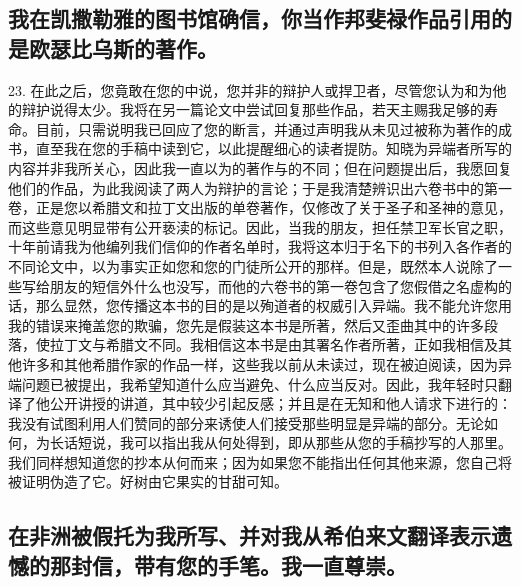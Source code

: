 
\subsection{我在凯撒勒雅的图书馆确信，你当作邦斐禄作品引用的是欧瑟比乌斯的著作。}

23. 在此之后，您竟敢在您的中说，您并非的辩护人或捍卫者，尽管您认为和为他的辩护说得太少。我将在另一篇论文中尝试回复那些作品，若天主赐我足够的寿命。目前，只需说明我已回应了您的断言，并通过声明我从未见过被称为著作的成书，直至我在您的手稿中读到它，以此提醒细心的读者提防。知晓为异端者所写的内容并非我所关心，因此我一直以为的著作与的不同；但在问题提出后，我愿回复他们的作品，为此我阅读了两人为辩护的言论；于是我清楚辨识出六卷书中的第一卷，正是您以希腊文和拉丁文出版的单卷著作，仅修改了关于圣子和圣神的意见，而这些意见明显带有公开亵渎的标记。因此，当我的朋友，担任禁卫军长官之职，十年前请我为他编列我们信仰的作者名单时，我将这本归于名下的书列入各作者的不同论文中，以为事实正如您和您的门徒所公开的那样。但是，既然本人说除了一些写给朋友的短信外什么也没写，而他的六卷书的第一卷包含了您假借之名虚构的话，那么显然，您传播这本书的目的是以殉道者的权威引入异端。我不能允许您用我的错误来掩盖您的欺骗，您先是假装这本书是所著，然后又歪曲其中的许多段落，使拉丁文与希腊文不同。我相信这本书是由其署名作者所著，正如我相信及其他许多和其他希腊作家的作品一样，这些我以前从未读过，现在被迫阅读，因为异端问题已被提出，我希望知道什么应当避免、什么应当反对。因此，我年轻时只翻译了他公开讲授的讲道，其中较少引起反感；并且是在无知和他人请求下进行的：我没有试图利用人们赞同的部分来诱使人们接受那些明显是异端的部分。无论如何，为长话短说，我可以指出我从何处得到，即从那些从您的手稿抄写的人那里。我们同样想知道您的抄本从何而来；因为如果您不能指出任何其他来源，您自己将被证明伪造了它。好树由它果实的甘甜可知。\par


\subsection{在非洲被假托为我所写、并对我从希伯来文翻译表示遗憾的那封信，带有您的手笔。我一直尊崇。}


